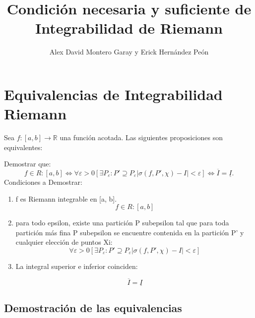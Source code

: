 \documentclass{article}
\title{Condición necesaria y suficiente de Integrabilidad de Riemann}
\author{Alex David Montero Garay y Erick Hernández Peón }
\date{}
\begin{document}
	\maketitle
	
	\section{Equivalencias de Integrabilidad Riemann}
	Sea \( f: [a, b] \to \mathbb{R} \) una función acotada. Las siguientes proposiciones son equivalentes:
	
	Demostrar que:
	\[
	   f \in R:[a,b] \iff \forall \varepsilon >0   [\exists P_\varepsilon :  P' \supseteq P_\varepsilon 	|\sigma(f, P', \chi) - I| < \varepsilon] \iff 	\overline{ I } = \underline{I}.
	\]
	Condiciones a Demostrar:
	\begin{enumerate}
		\item f es Riemann integrable en [a, b]. \[  f \in R:[a,b] \]
		\item  para todo epsilon, existe una partición P subepsilon tal que para toda partición más fina P subepsilon se encuentre contenida en la partición P' y cualquier elección de puntos Xi: 
		\[ \forall \varepsilon>0   [\exists P_\varepsilon :  P' \supseteq P_\varepsilon 	|\sigma(f, P', \chi) - I| < \varepsilon]
		\]
		
	
		\item La integral superior e inferior coinciden:
		
		
		\[
		\overline{I} = \underline{I} 
		\]
		
		
	\end{enumerate}
	
	\subsection*{Demostración de las equivalencias}
	
\end{document}
